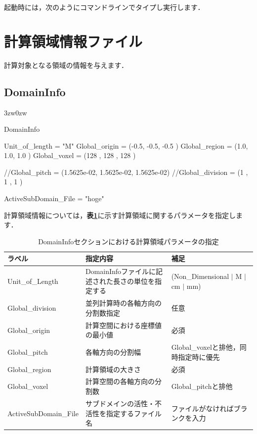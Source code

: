 起動時には，次のようにコマンドラインでタイプし実行します．
{
\small 
{}
}




\pagebreak
\section{計算領域情報ファイル}
計算対象となる領域の情報を与えます．

%
\subsection{DomainInfo}

\begin{indentation}{3zw}{0zw}

{\small
\begin{program}
DomainInfo {
  Unit_of_length  = "M"
  Global_origin   = (-0.5, -0.5, -0.5   )
  Global_region   = (1.0,  1.0,  1.0    )
  Global_voxel    = (128   , 128   , 128   )
  
  //Global_pitch    = (1.5625e-02, 1.5625e-02, 1.5625e-02)
  //Global_division = (1    , 1    , 1    )

  ActiveSubDomain_File = "hoge"
}
\end{program}
}

計算領域情報については，\textbf{表\ref{tbl:region_info}}に示す計算領域に関するパラメータを指定します．

\begin{table}[htdp]
\caption{DomainInfoセクションにおける計算領域パラメータの指定}
\begin{center}
\small
\begin{tabular}{lll} \toprule
ラベル & 指定内容 & 補足\\ \midrule
Unit\_of\_Length & DomainInfoファイルに記述された長さの単位を指定する & (Non\_Dimensional $|$ M $|$ cm $|$ mm)\\
Global\_division & 並列計算時の各軸方向の分割数指定 & 任意\\ 
Global\_origin & 計算空間における座標値の最小値 & 必須\\
Global\_pitch & 各軸方向の分割幅 &Global\_voxelと排他，同時指定時に優先\\
Global\_region & 計算領域の大きさ & 必須\\ 
Global\_voxel & 計算空間の各軸方向の分割数 & Global\_pitchと排他\\
ActiveSubDomain\_File & サブドメインの活性・不活性を指定するファイル名 & ファイルがなければブランクを入力\\ \bottomrule
\end{tabular}
\end{center}
\label{tbl:region_info}
\end{table}

\end{indentation}



